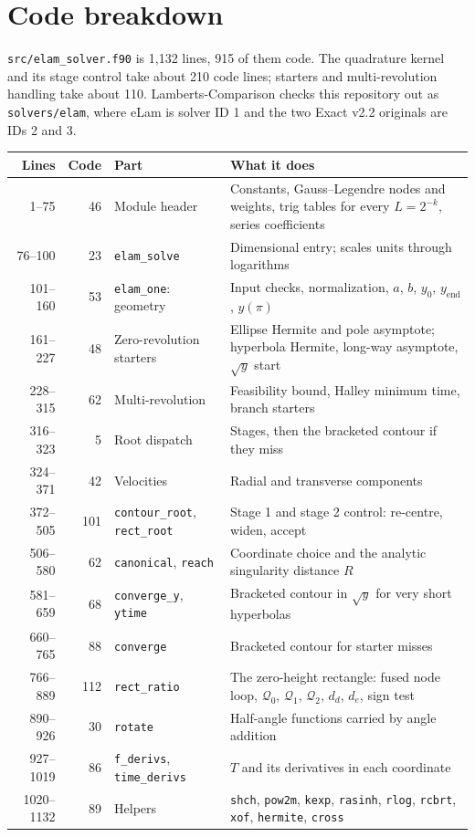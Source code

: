 \documentclass[11pt]{article}
\newcommand{\code}[1]{\texttt{#1}}
\newcommand{\Q}{\mathcal{Q}}
\begin{document}
\section{Code breakdown}

\code{src/elam\_solver.f90} is 1,132 lines, 915 of them code. The quadrature kernel and its stage control take about 210 code lines; starters and multi-revolution handling take about 110. Lamberts-Comparison checks this repository out as \code{solvers/elam}, where eLam is solver ID 1 and the two Exact v2.2 originals are IDs 2 and 3.

{\small
\begin{tabularx}{\linewidth}{r r >{\raggedright\arraybackslash}p{3.7cm} >{\raggedright\arraybackslash}X}
\toprule
Lines & Code & Part & What it does \\
\midrule
1--75 & 46 & Module header & Constants, Gauss--Legendre nodes and weights, trig tables for every $L=2^{-k}$, series coefficients \\
76--100 & 23 & \code{elam\_solve} & Dimensional entry; scales units through logarithms \\
101--160 & 53 & \code{elam\_one}: geometry & Input checks, normalization, $a$, $b$, $y_0$, $y_\text{end}$, $y(\pi)$ \\
161--227 & 48 & Zero-revolution starters & Ellipse Hermite and pole asymptote; hyperbola Hermite, long-way asymptote, $\sqrt{y}$ start \\
228--315 & 62 & Multi-revolution & Feasibility bound, Halley minimum time, branch starters \\
316--323 & 5 & Root dispatch & Stages, then the bracketed contour if they miss \\
324--371 & 42 & Velocities & Radial and transverse components \\
372--505 & 101 & \code{contour\_root}, \code{rect\_root} & Stage 1 and stage 2 control: re-centre, widen, accept \\
506--580 & 62 & \code{canonical}, \code{reach} & Coordinate choice and the analytic singularity distance $R$ \\
581--659 & 68 & \code{converge\_y}, \code{ytime} & Bracketed contour in $\sqrt{y}$ for very short hyperbolas \\
660--765 & 88 & \code{converge} & Bracketed contour for starter misses \\
766--889 & 112 & \code{rect\_ratio} & The zero-height rectangle: fused node loop, $\Q_0$, $\Q_1$, $\Q_2$, $d_d$, $d_e$, sign test \\
890--926 & 30 & \code{rotate} & Half-angle functions carried by angle addition \\
927--1019 & 86 & \code{f\_derivs}, \code{time\_derivs} & $T$ and its derivatives in each coordinate \\
1020--1132 & 89 & Helpers & \code{shch}, \code{pow2m}, \code{kexp}, \code{rasinh}, \code{rlog}, \code{rcbrt}, \code{xof}, \code{hermite}, \code{cross} \\
\bottomrule
\end{tabularx}
}
\end{document}
